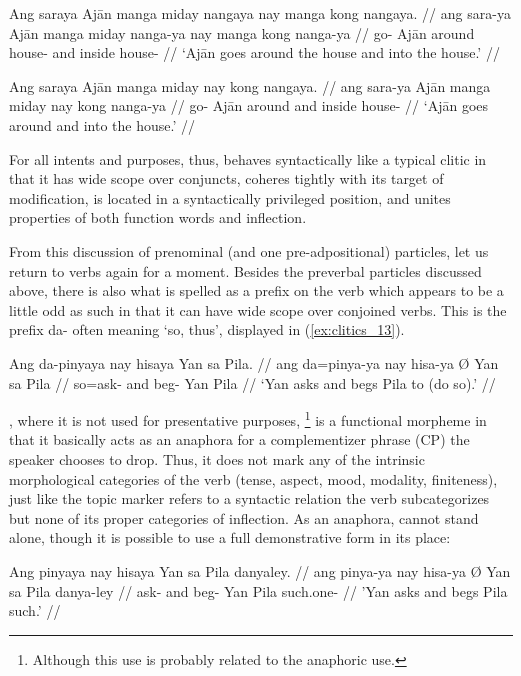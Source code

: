 \pex\label{ex:clitics_mangacoord}
\a\label{ex:clitics_mangacoord1}\begingl
	\gla Ang saraya Ajān manga miday nangaya nay manga kong nangaya. //
	\glb ang sara-ya Ajān manga miday nanga-ya nay manga kong nanga-ya //
	\glc \AgtT{} go-\TsgM{} Ajān \Dyn{} around house-\Loc{} and \Dyn{} inside
		house-\Loc{} //
	\glft `Ajān goes around the house and into the house.' //
\endgl

\a\label{ex:clitics_mangacoord2}\begingl
	\gla Ang saraya Ajān manga miday nay kong nangaya. //
	\glb ang sara-ya Ajān manga miday nay kong nanga-ya //
	\glc \AgtT{} go-\TsgM{} Ajān \Dyn{} around and inside house-\Loc{} //
	\glft `Ajān goes around and into the house.' //
\endgl
\xe

For all intents and purposes, thus,  behaves syntactically like
a typical clitic in that it has wide scope over conjuncts, coheres tightly with
its target of modification, is located in a syntactically privileged position,
and unites properties of both function words and inflection.

From this discussion of prenominal (and one pre-adpositional) particles, let us
return to verbs again for a moment. Besides the preverbal particles discussed
above, there is also what is spelled as a prefix on the verb which appears to
be a little odd as such in that it can have wide scope over conjoined verbs.
This is the prefix  {da-} often meaning `so, thus', displayed in
(\ref{ex:clitics_13}).

\ex\label{ex:clitics_13}\begingl
	\gla Ang da-pinyaya nay hisaya {} Yan sa Pila. //
	\glb ang da=pinya-ya nay hisa-ya Ø Yan sa Pila //
	\glc \AgtT{} so=ask-\TsgM{} and beg-\TsgM{} \Top{} Yan \Parg{} Pila //
	\glft `Yan asks and begs Pila to (do so).' //
\endgl\xe

, where it is not used for presentative purposes,
\footnote{Although this use is probably related to the anaphoric use.} is a
functional morpheme in that it basically acts as an anaphora for a
complementizer phrase (CP) the speaker chooses to drop. Thus, it does not mark
any of the intrinsic morphological categories of the verb (tense, aspect, mood,
modality, finiteness), just like the topic marker refers to a syntactic
relation the verb subcategorizes but none of its proper categories of 
inflection. As an anaphora,  cannot stand alone, though it is 
possible to use a full demonstrative form  in its 
place:

\ex\label{ex:clitics_14}\begingl
	\gla Ang pinyaya nay hisaya {} Yan sa Pila danyaley. //
	\glb ang pinya-ya nay hisa-ya Ø Yan sa Pila danya-ley //
	\glc \AgtT{} ask-\TsgM{} and beg-\TsgM{} \Top{} Yan \Parg{} Pila
		such.one-\PargI{} //
	\glft 'Yan asks and begs Pila such.' //
\endgl\xe


